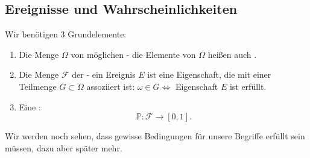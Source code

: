 \subsection{Ereignisse und Wahrscheinlichkeiten}
Wir benötigen 3 Grundelemente:
\begin{enumerate}[(1)]
    \item Die Menge $\Omega$ von möglichen  - die Elemente von $\Omega$ heißen auch  .
    \item Die Menge $\mathcal{F}$ der  - ein Ereignis  $E$ ist eine Eigenschaft, die mit einer Teilmenge $G\subset \Omega$ assoziiert ist: $ω\in G \iff $ Eigenschaft $E$ ist erfüllt.
    \item Eine :
        \[
            \mathbb{P}: \mathcal{F} \to  [0,1]
        .\] 
\end{enumerate}
\begin{remark*}
    Wir werden noch sehen, dass gewisse Bedingungen für unsere Begriffe erfüllt sein müssen, dazu aber später mehr.
\end{remark*}

